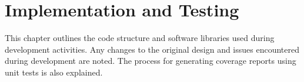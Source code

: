 \graphicspath{{main/implementation/graphics/}}

\chapter{Implementation and Testing}

This chapter outlines the code structure and software libraries used during development activities. Any changes to the original design and issues encountered during development are noted. The process for generating coverage reports using unit tests is also explained.

\clearpage


\clearpage
